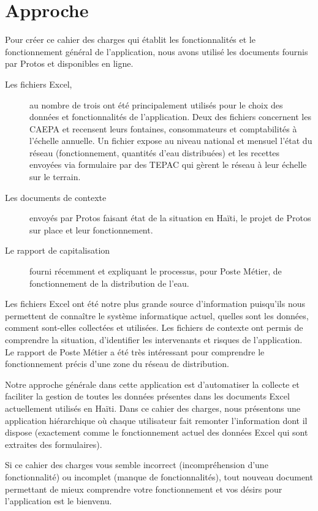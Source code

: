\documentclass[a4paper, 11pt]{article}
\begin{document}
\section{Approche \label{sec:approach}}
  Pour créer ce cahier des charges qui établit les fonctionnalités et le fonctionnement général de l'application, nous avons utilisé les documents fournis par Protos et disponibles en ligne.
  \begin{description}
    \item[Les fichiers Excel,] au nombre de trois ont été principalement utilisés pour le choix des données et fonctionnalités de l'application. Deux des fichiers concernent les CAEPA et recensent leurs fontaines, consommateurs et comptabilités à l'échelle annuelle. Un fichier expose au niveau national et mensuel l'état du réseau (fonctionnement, quantités d'eau distribuées) et les recettes envoyées via formulaire par des TEPAC qui gèrent le réseau à leur échelle sur le terrain.
    \item[Les documents de contexte] envoyés par Protos faisant état de la situation en Haïti, le projet de Protos sur place et leur fonctionnement.
    \item[Le rapport de capitalisation] fourni récemment et expliquant le processus, pour Poste Métier, de fonctionnement de la distribution de l'eau.
  \end{description}
  Les fichiers Excel ont été notre plus grande source d'information puisqu'ils nous permettent de connaître le système informatique actuel, quelles sont les données, comment sont-elles collectées et utilisées.
  Les fichiers de contexte ont permis de comprendre la situation, d'identifier les intervenants et risques de l'application.
  Le rapport de Poste Métier a été très intéressant pour comprendre le fonctionnement précis d'une zone du réseau de distribution.

  Notre approche générale dans cette application est d'automatiser la collecte et faciliter la gestion de toutes les données présentes dans les documents Excel actuellement utilisés en Haïti. Dans ce cahier des charges, nous présentons une application hiérarchique où chaque utilisateur fait remonter l'information dont il dispose (exactement comme le fonctionnement actuel des données Excel qui sont extraites des formulaires).

  \begin{shaded}
    Si ce cahier des charges vous semble incorrect (incompréhension d'une fonctionnalité) ou incomplet (manque de fonctionnalités), tout nouveau document permettant de mieux comprendre votre fonctionnement et vos désirs pour l'application est le bienvenu.
  \end{shaded}
\end{document}
